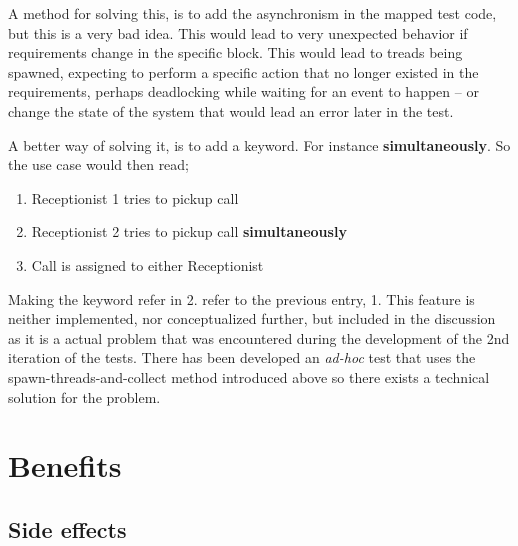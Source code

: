 \noindent A method for solving this, is to add the asynchronism in the mapped test code, but this is a very bad idea. This would lead to very unexpected behavior if requirements change in the specific block. This would lead to treads being spawned, expecting to perform a specific action that no longer existed in the requirements, perhaps deadlocking while waiting for an event to happen -- or change the state of the system that would lead an error later in the test.\medskip

\noindent A better way of solving it, is to add a keyword. For instance \textbf{simultaneously}. So the use case would then read;
\begin{enumerate}
 \item Receptionist 1 tries to pickup call
 \item Receptionist 2 tries to pickup call \textbf{simultaneously}
 \item Call is assigned to either Receptionist
\end{enumerate}
Making the keyword refer in 2. refer to the previous entry, 1. This feature is neither implemented, nor conceptualized further, but included in the discussion as it is a actual problem that was encountered during the development of the 2nd iteration of the tests. There has been developed an \emph{ad-hoc} test that uses the spawn-threads-and-collect method introduced above so there exists a technical solution for the problem.

\section{Benefits}
\subsection{Side effects}

